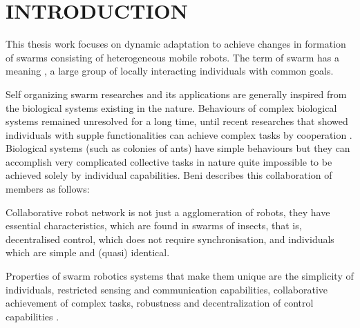 

\chapter{INTRODUCTION}
\label{chp:introduction}

This thesis work focuses on dynamic adaptation to achieve changes in formation of swarms consisting of heterogeneous mobile robots. The term of swarm has a meaning \cite{4}, a large group of locally interacting individuals with common goals. 

Self organizing swarm researches and its applications are generally inspired from the biological systems existing in the nature. Behaviours of complex biological systems remained unresolved for a long time, until recent researches that showed individuals with supple functionalities can achieve complex tasks by cooperation \cite{2}. Biological systems (such as colonies of ants) have simple behaviours but they can accomplish very complicated collective tasks in nature quite impossible to be achieved solely by individual capabilities. Beni \cite{1} describes this collaboration of members as follows:

Collaborative robot network is not just a agglomeration of robots, they have essential characteristics, which are found in swarms of insects, that is, decentralised control, which does not require synchronisation, and individuals which are simple and (quasi) identical.

Properties of swarm robotics systems that make them unique are the simplicity of individuals, restricted sensing and communication capabilities, collaborative achievement of complex tasks, robustness and decentralization of control capabilities \cite{6}.

